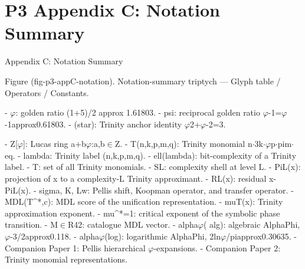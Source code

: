 
\section{P3 Appendix C: Notation Summary}

Appendix C: Notation Summary

  Figure (fig-p3-appC-notation). Notation-summary triptych --- Glyph table / Operators / Constants.

  - $\varphi$: golden ratio (1+5)/2 approx 1.61803.
  - psi: reciprocal golden ratio $\varphi$-1=$\varphi$-1approx0.61803.
  - (star): Trinity anchor identity $\varphi$2+$\varphi$-2=3.

  - Z[$\varphi$]: Lucas ring {a+b$\varphi$:a,b$\in$Z}.
  - T(n,k,p,m,q): Trinity monomial n$\cdot$3k$\cdot\varphi$p$\cdot$pim$\cdot$ eq.
  - lambda: Trinity label (n,k,p,m,q).
  - ell(lambda): bit-complexity of a Trinity label.
  - T: set of all Trinity monomials.
  - SL: complexity shell at level L.
  - PiL(x): projection of x to a complexity-L Trinity approximant.
  - RL(x): residual x-PiL(x).
  - sigma, K, Lw: Pellis shift, Koopman operator, and transfer operator.
  - MDL(T^*,c): MDL score of the unification representation.
  - muT(x): Trinity approximation exponent.
  - mu^*=1: critical exponent of the symbolic phase transition.
  - M$\in$R42: catalogue MDL vector.
  - alpha$\varphi$( alg): algebraic AlphaPhi, $\varphi$-3/2approx0.118.
  - alpha$\varphi$(log): logarithmic AlphaPhi, 2ln$\varphi$/piapprox0.30635.
  - Companion Paper 1: Pellis hierarchical $\varphi$-expansions.
  - Companion Paper 2: Trinity monomial representations.